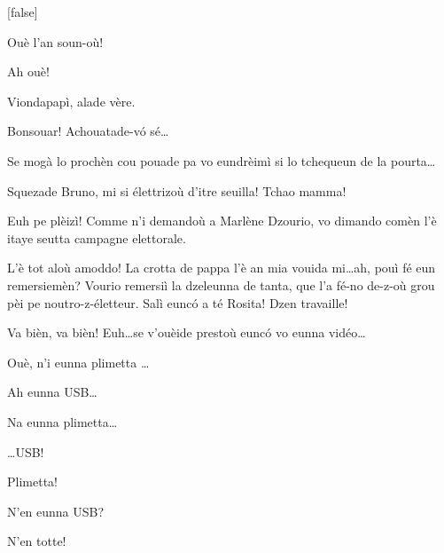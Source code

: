 \begin{drama}
[false]

\Presidanspeaks Ouè l'an soun-où!

\Brunospeaks Ah ouè!

\Brunospeaks Viondapapì, alade vère.



\Brunospeaks {} Bonsouar! Achouatade-v\'o sé\ldots


\Brunospeaks Se mogà lo prochèn cou pouade pa vo eundrèimì si lo tchequeun de la pourta\ldots

\Jordyspeaks {} Squezade Bruno, mi si élettrizoù d'itre seuilla!  Tchao mamma!

\Brunospeaks {} Euh pe plèizì! Comme n'i demandoù a Marlène Dzourio, vo dimando comèn l'è itaye seutta campagne elettorale.

\Jordyspeaks L'è tot aloù amoddo! La crotta de pappa l'è an mia vouida mi\ldots ah, pouì fé eun remersiemèn? Vourio remersiì la dzeleunna de tanta, que l'a fé-no de-z-où grou pèi  pe noutro-z-életteur. Salì eunc\'o a té Rosita! Dzen travaille!

\Brunospeaks {} Va bièn, va bièn! Euh\ldots se v'ouèide prestoù eunc\'o vo eunna vidéo\ldots

\Jordyspeaks {} Ouè, n'i eunna plimetta \usb \ldots


\Brunospeaks  Ah eunna USB\ldots

\Jordyspeaks Na eunna plimetta\ldots

\Brunospeaks {} \ldots USB! 

\Jordyspeaks Plimetta!

\Brunospeaks{} N'en eunna USB?

\Noteospeaks N'en totte!


\end{drama}
